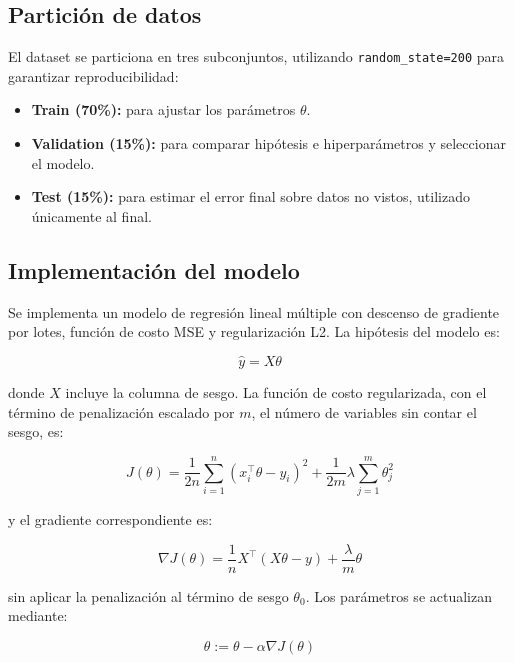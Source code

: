 \documentclass[journal]{IEEEtran}
\begin{document}
\subsection{Partición de datos}
El dataset se particiona en tres subconjuntos, utilizando \texttt{random\_state=200} para garantizar reproducibilidad:
\begin{itemize}
    \item \textbf{Train (70\%):} para ajustar los parámetros $\theta$.
    \item \textbf{Validation (15\%):} para comparar hipótesis e hiperparámetros y seleccionar el modelo.
    \item \textbf{Test (15\%):} para estimar el error final sobre datos no vistos, utilizado únicamente al final.
\end{itemize}

\subsection{Implementación del modelo}
Se implementa un modelo de regresión lineal múltiple con descenso de gradiente por lotes, función de costo MSE y regularización L2. La hipótesis del modelo es:

\begin{equation}
\hat{y} = X\theta
\label{eq:hipotesis_lineal}
\end{equation}

donde $X$ incluye la columna de sesgo. La función de costo regularizada, con el término de penalización escalado por $m$, el número de variables sin contar el sesgo, es:

\begin{equation}
J(\theta) = \frac{1}{2n}\sum_{i=1}^{n} (x_i^\top\theta - y_i)^2 + \frac{1}{2m}\lambda\sum_{j=1}^{m}\theta_j^2
\label{eq:mse_reg}
\end{equation}

y el gradiente correspondiente es:

\begin{equation}
\nabla J(\theta) = \frac{1}{n}X^\top(X\theta-y) + \frac{\lambda}{m}\theta
\label{eq:grad_lineal}
\end{equation}

sin aplicar la penalización al término de sesgo $\theta_0$. Los parámetros se actualizan mediante:

\begin{equation}
\theta := \theta - \alpha\nabla J(\theta)
\label{eq:update_lineal}
\end{equation}
\end{document}
